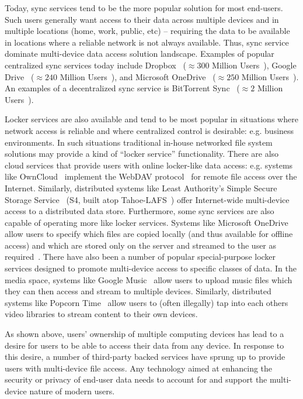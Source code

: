 Today, sync services tend to be the more popular solution for most
end-users. Such users generally want access to their data across
multiple devices and in multiple locations (home, work, public,
etc) -- requiring the data to be available in locations where a
reliable network is not always available. Thus, sync service dominate
multi-device data access solution landscape. Examples of popular
centralized sync services today include Dropbox~\cite{dropbox}
($\approx300$ Million Users~\cite{smith-stats}), Google
Drive~\cite{google-drive} ($\approx240$ Million
Users~\cite{smith-stats}), and Microsoft
OneDrive~\cite{microsoft-onedrive} ($\approx250$ Million
Users~\cite{smith-stats}).  An examples of a decentralized sync
service is BitTorrent Sync~\cite{bittorrent-sync} ($\approx2$ Million
Users~\cite{smith-stats}).

Locker services are also available and tend to be most popular in
situations where network access is reliable and where centralized
control is desirable: e.g. business environments. In such situations
traditional in-house networked file system solutions may provide a
kind of ``locker service'' functionality. There are also cloud
services that provide users with online locker-like data access:
e.g. systems like OwnCloud~\cite{owncloud} implement the WebDAV
protocol~\cite{goland1999} for remote file access over the
Internet. Similarly, distributed systems like Least Authority's Simple
Secure Storage Service~\cite{leastauthority-s4} (S4, built atop
Tahoe-LAFS~\cite{wilcox-o'hearn2008}) offer Internet-wide multi-device
access to a distributed data store. Furthermore, some sync services
are also capable of operating more like locker services. Systems like
Microsoft OneDrive allow users to specify which files are copied
locally (and thus available for offline access) and which are stored
only on the server and streamed to the user as
required~\cite{microsoft-onedrive-online}. There have also been a
number of popular special-purpose locker services designed to promote
multi-device access to specific classes of data. In the media space,
systems like Google Music~\cite{google-music} allow users to upload
music files which they can then access and stream to multiple
devices. Similarly, distributed systems like Popcorn
Time~\cite{popcorntime} allow users to (often illegally) tap into each
others video libraries to stream content to their own devices.

As shown above, users' ownership of multiple computing devices has
lead to a desire for users to be able to access their data from any
device. In response to this desire, a number of third-party backed
services have sprung up to provide users with multi-device file
access. Any technology aimed at enhancing the security or privacy of
end-user data needs to account for and support the multi-device nature
of modern users.

